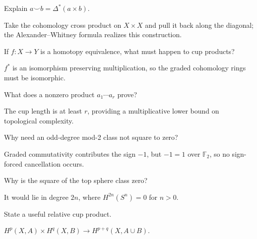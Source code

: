 \begin{problem}[Diagonal]\label{prob:viii29-11}
Explain \(a\smile b=\Delta^*(a\times b)\).
\end{problem}
\begin{solution}
Take the cohomology cross product on \(X\times X\) and pull it back along the diagonal; the Alexander--Whitney formula realizes this construction.
\end{solution}

\begin{problem}\label{prob:viii29-12}
If \(f:X\to Y\) is a homotopy equivalence, what must happen to cup products?
\end{problem}
\begin{solution}
\(f^*\) is an isomorphism preserving multiplication, so the graded cohomology rings must be isomorphic.
\end{solution}

\begin{problem}\label{prob:viii29-13}
What does a nonzero product \(a_1\cdots a_r\) prove?
\end{problem}
\begin{solution}
The cup length is at least \(r\), providing a multiplicative lower bound on topological complexity.
\end{solution}

\begin{problem}\label{prob:viii29-14}
Why need an odd-degree mod-2 class not square to zero?
\end{problem}
\begin{solution}
Graded commutativity contributes the sign \(-1\), but \(-1=1\) over \(\mathbb F_2\), so no sign-forced cancellation occurs.
\end{solution}

\begin{problem}[Sphere]\label{prob:viii29-15}
Why is the square of the top sphere class zero?
\end{problem}
\begin{solution}
It would lie in degree \(2n\), where \(H^{2n}(S^n)=0\) for \(n>0\).
\end{solution}

\begin{problem}\label{prob:viii29-16}
State a useful relative cup product.
\end{problem}
\begin{solution}
\(H^p(X,A)\times H^q(X,B)\to H^{p+q}(X,A\cup B)\).
\end{solution}

